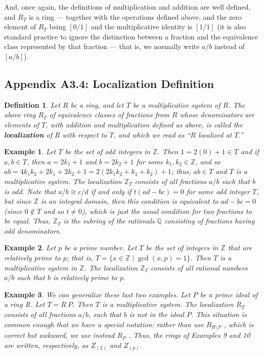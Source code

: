 \documentclass[12pt,reqno]{amsart}
\theoremstyle{plain}
\newtheorem{defi}{Definition}
\newtheorem{ex}{Example}
\newcommand{\zz}{\mathbb Z}
\newcommand{\qq}{\mathbb Q}
\begin{document}
And, once again, the definitions of multiplication and addition are well defined, and $R_T$ is a ring — together with the operations defined above, and the zero element of $R_T$ being $[0/1]$ and the multiplicative identity is $[1/1]$ (it is also standard practice to ignore the distinction between a fraction and the equivalence class represented by that fraction — that is, we normally write $a/b$ instead of $[a/b]$).
 
\subsection{Appendix A3.4: Localization Definition}\begin{defi} Let $R$ be a ring, and let $T$ be a multiplicative system of $R$. The above ring $R_T$ of equivalence classes of fractions from $R$ whose denominators are elements of $T$, with addition and multiplication defined as above, is called the \textbf{localization} of $R$ with respect to $T$, and which we read as ``$R$ localized at $T$.” 
\end{defi} 
\begin{ex} Let $T$ be the set of odd integers in $\zz$. Then $1 = 2(0)+1 \in T$ and if $a, b \in T$, then $a=2k_1 +1 $ and $b=2k_2 + 1$ for some $k_1, k_2 \in \zz$, and so $ab = 4k_1 k_2 +2 k_1 + 2k_2 + 1 = 2(2k_1 k_2 + k_1 + k_2) + 1$; thus, $ab \in T$ and $T$ is a multiplicative system.  The localization $\zz_T$ consists of all fractions $a/b$ such that $b$ is odd. Note that $a/b \cong c/d$ if and only if $t(ad-bc) = 0$ for some odd integer $T$, but since $\zz$ is an integral domain, then this condition is equivalent to $ad-bc = 0$ (since $0 \notin T$ and so $t \neq 0$), which is just the usual condition for two fractions to be equal. Thus, $\zz_T$ is the subring of the rationals $\qq$ consisting of fractions having odd denominators. 
\end{ex} 
\begin{ex} Let $p$ be a prime number. Let $T$ be the set of integers in $\zz$ that are relatively prime to $p$; that is, $T = \{ x \in \zz \mid \gcd (x, p ) = 1\}$. Then $T$ is a multiplicative system in $\zz$. The localization $\zz_T$ consists of all rational numbers $a/b$ such that $b$ is relatively prime to $p$.
\end{ex} 
\begin{ex} 
We can generalize these last two examples. Let $P$ be a prime ideal of a ring R. Let $T = R \ P$. Then $T$ is a multiplicative system. The localization $R_T$ consists of all fractions $a/b$, such that $b$ is not in the ideal $P$. This situation is common enough that we have a special notation: rather than use $R_{ R \setminus P}$ , which is correct but awkward, we use instead $R_P$ . Thus, the rings of Examples 9 and 10 are written, respectively, as $Z_{(2)}$ and $Z_{(p)}$.
\end{ex} 
\end{document}
